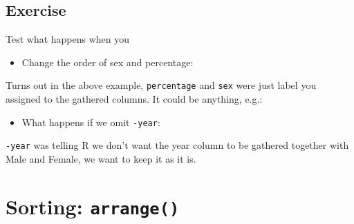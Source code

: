 \documentclass[]{book}
\makeatletter
\newenvironment{Shaded}{\begin{snugshade}}{\end{snugshade}}
\newcommand{\DataTypeTok}[1]{\textcolor[rgb]{0.13,0.29,0.53}{#1}}
\newcommand{\KeywordTok}[1]{\textcolor[rgb]{0.13,0.29,0.53}{\textbf{#1}}}
\newcommand{\NormalTok}[1]{#1}
\newcommand{\OperatorTok}[1]{\textcolor[rgb]{0.81,0.36,0.00}{\textbf{#1}}}
\newcommand{\StringTok}[1]{\textcolor[rgb]{0.31,0.60,0.02}{#1}}
\providecommand{\tightlist}{%
  \setlength{\itemsep}{0pt}\setlength{\parskip}{0pt}}
\newenvironment{kframe}{%
\medskip{}
\setlength{\fboxsep}{.8em}
 \def\at@end@of@kframe{}%
 \ifinner\ifhmode%
  \def\at@end@of@kframe{\end{minipage}}%
  \begin{minipage}{\columnwidth}%
 \fi\fi%
 \def\FrameCommand##1{\hskip\@totalleftmargin \hskip-\fboxsep
 \colorbox{shadecolor}{##1}\hskip-\fboxsep
     \hskip-\linewidth \hskip-\@totalleftmargin \hskip\columnwidth}%
 \MakeFramed {\advance\hsize-\width
   \@totalleftmargin\z@ \linewidth\hsize
   \@setminipage}}%
 {\par\unskip\endMakeFramed%
 \at@end@of@kframe}
\renewenvironment{Shaded}{\begin{kframe}}{\end{kframe}}
\theoremstyle{definition}
\theoremstyle{definition}
\theoremstyle{definition}
\theoremstyle{remark}
\makeatother
\begin{document}
\hypertarget{exercise-15}{%
\subsection{Exercise}\label{exercise-15}}

Test what happens when you

\begin{itemize}
\tightlist
\item
  Change the order of sex and percentage:
\end{itemize}

\begin{Shaded}
\end{Shaded}

Turns out in the above example, \texttt{percentage} and \texttt{sex}
were just label you assigned to the gathered columns. It could be
anything, e.g.:

\begin{Shaded}
\end{Shaded}

\begin{itemize}
\tightlist
\item
  What happens if we omit \texttt{-year}:
\end{itemize}

\begin{Shaded}
\end{Shaded}

\texttt{-year} was telling R we don't want the year column to be
gathered together with Male and Female, we want to keep it as it is.

\hypertarget{sorting-arrange}{%
\section{\texorpdfstring{Sorting:
\texttt{arrange()}}{Sorting: arrange()}}\label{sorting-arrange}}
\end{document}
